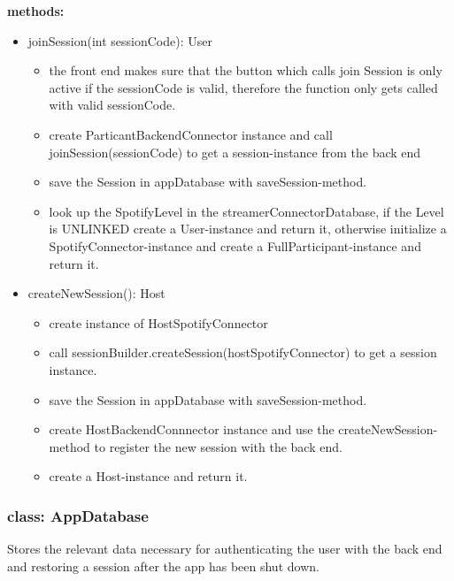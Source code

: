 \documentclass[oneside, ngerman]{sdqtechreport}
\begin{document}
\textbf{methods:}
\begin{itemize}
    \item joinSession(int sessionCode): User
    \begin{itemize}
        \item the front end makes sure that the button which calls join Session is only active if the sessionCode is valid, therefore the function only gets called with valid sessionCode.
        \item create ParticantBackendConnector instance and call joinSession(sessionCode) to get a session-instance from the back end 
        \item save the Session in appDatabase with saveSession-method.
        \item look up the SpotifyLevel in the streamerConnectorDatabase, if the Level is UNLINKED create a User-instance and return it, otherwise initialize a SpotifyConnector-instance and create a FullParticipant-instance
        and return it.
        
    \end{itemize}
    \item createNewSession(): Host
    \begin{itemize}
        \item create instance of HostSpotifyConnector
        \item call sessionBuilder.createSession(hostSpotifyConnector) to get a session instance.
        \item save the Session in appDatabase with saveSession-method.
        \item create HostBackendConnnector instance and use the createNewSession-method to register the new session with the back end.
        \item create a Host-instance and return it.
    \end{itemize}
\end{itemize}

\subsubsection{class: AppDatabase}
Stores the relevant data necessary for authenticating the user with the back end and restoring a session after the app has been shut down.
\end{document}
